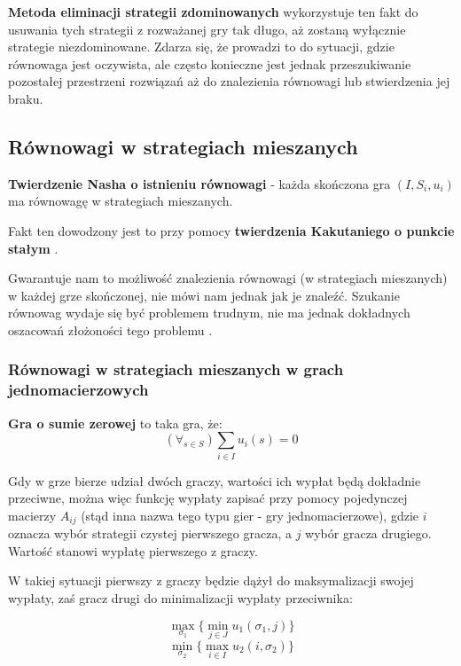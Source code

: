\documentclass[polish]{standalone}
\begin{document}
\textbf{Metoda eliminacji strategii zdominowanych} wykorzystuje ten fakt do usuwania tych strategii z rozważanej gry
tak długo, aż zostaną wyłącznie strategie niezdominowane. Zdarza się, że prowadzi to do sytuacji, gdzie równowaga jest
oczywista, ale często konieczne jest jednak przeszukiwanie pozostałej przestrzeni rozwiązań aż do znalezienia
równowagi lub stwierdzenia jej braku.

\subsection{Równowagi w strategiach mieszanych}

\begin{theorem}
\textbf{Twierdzenie Nasha o istnieniu równowagi} - każda skończona gra $(I, S_i, u_i)$ ma równowagę w strategiach
mieszanych.
\cite[str.~29]{FT-GT}
\end{theorem}

Fakt ten dowodzony jest to przy pomocy \textbf{twierdzenia Kakutaniego o punkcie stałym} \cite[str.~29]{FT-GT}.

Gwarantuje nam to możliwość znalezienia równowagi (w strategiach mieszanych) w każdej grze skończonej, nie mówi nam
jednak jak je znaleźć. Szukanie równowag wydaje się być problemem trudnym, nie ma jednak dokładnych oszacowań złożoności
tego problemu \cite{P-AGI}.

\subsubsection{Równowagi w strategiach mieszanych w grach jednomacierzowych}

\begin{definition}
\textbf{Gra o sumie zerowej} to taka gra, że:
$$(\forall_{s \in S}) \sum_{i \in I} u_i(s) = 0$$
\end{definition}

Gdy w grze bierze udział dwóch graczy, wartości ich wypłat będą dokładnie przeciwne, można więc funkcję wypłaty zapisać
przy pomocy pojedynczej macierzy $A_{ij}$ (stąd inna nazwa tego typu gier - gry jednomacierzowe), gdzie $i$ oznacza
wybór strategii czystej pierwszego gracza, a $j$ wybór gracza drugiego. Wartość stanowi wypłatę pierwszego z graczy.

W takiej sytuacji pierwszy z graczy będzie dążył do maksymalizacji swojej wypłaty, zaś gracz drugi do minimalizacji
wypłaty przeciwnika:

$$\max_{\sigma_1} \{ \min_{j \in J} u_1(\sigma_1, j) \}$$
$$\min_{\sigma_2} \{ \max_{i \in I} u_2(i, \sigma_2) \}$$
\end{document}
